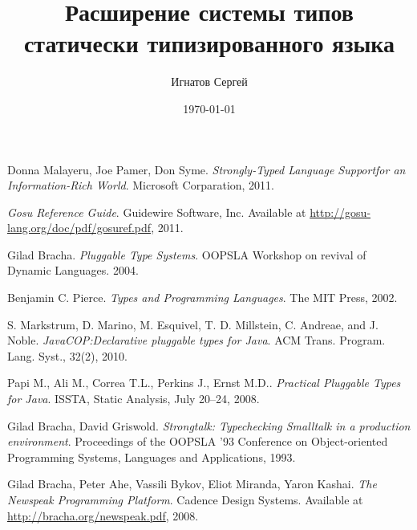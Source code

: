 \documentclass{article}
\title{Расширение системы типов статически типизированного языка}
\author{Игнатов Сергей}
\date{\rudate\today}
\begin{document}
\maketitle








\begin{thebibliography}{9}

    Donna Malayeru, Joe Pamer, Don Syme.
    \emph{Strongly-Typed Language Supportfor an Information-Rich World}.
    Microsoft Corparation,
    2011.

    \emph{Gosu Reference Guide}.
    Guidewire Software, Inc.
    Available at \url{http://gosu-lang.org/doc/pdf/gosuref.pdf},
    2011.

    Gilad Bracha.
    \emph{Pluggable Type Systems}.
    OOPSLA Workshop on revival of Dynamic Languages.
    2004.

    Benjamin C. Pierce.
    \emph{Types and Programming Languages}.
    The MIT Press, 2002.

    S. Markstrum, D. Marino, M. Esquivel, T. D. Millstein, C. Andreae, and J. Noble.
    \emph{JavaCOP:\@ Declarative pluggable types for Java}.
    ACM Trans. Program. Lang. Syst., 32(2), 2010.

    Papi M., Ali M., Correa T.L., Perkins J., Ernst M.D..
    \emph{Practical Pluggable Types for Java}.
    ISSTA, Static Analysis, July 20–24, 2008.

    Gilad Bracha, David Griswold.
    \emph{Strongtalk: Typechecking Smalltalk in a production environment}.
    Proceedings of the OOPSLA '93 Conference on Object-oriented Programming Systems, Languages and Applications, 1993.

    Gilad Bracha, Peter Ahe, Vassili Bykov, Eliot Miranda, Yaron Kashai.
    \emph{The Newspeak Programming Platform}.
    Cadence Design Systems.
    Available at \url{http://bracha.org/newspeak.pdf},
    2008.

\end{thebibliography}
\end{document}
